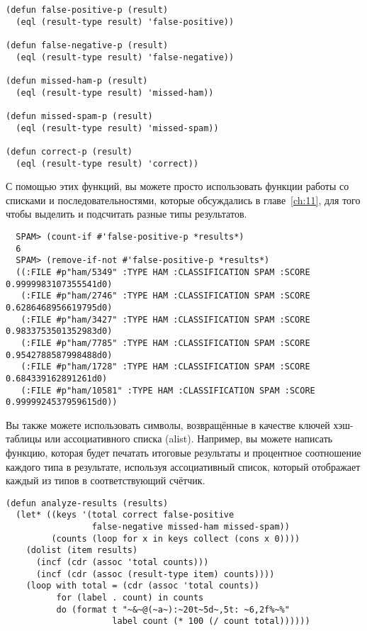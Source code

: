 \begin{lstlisting}
(defun false-positive-p (result)
  (eql (result-type result) 'false-positive))

(defun false-negative-p (result)
  (eql (result-type result) 'false-negative))

(defun missed-ham-p (result)
  (eql (result-type result) 'missed-ham))

(defun missed-spam-p (result)
  (eql (result-type result) 'missed-spam))

(defun correct-p (result)
  (eql (result-type result) 'correct))
\end{lstlisting}

С помощью этих функций, вы можете просто использовать функции работы со списками и
последовательностями, которые обсуждались в главе~\ref{ch:11}, для того чтобы выделить и
подсчитать разные типы результатов.

\begin{verbatim}
  SPAM> (count-if #'false-positive-p *results*)
  6
  SPAM> (remove-if-not #'false-positive-p *results*)
  ((:FILE #p"ham/5349" :TYPE HAM :CLASSIFICATION SPAM :SCORE 0.9999983107355541d0)
   (:FILE #p"ham/2746" :TYPE HAM :CLASSIFICATION SPAM :SCORE 0.6286468956619795d0)
   (:FILE #p"ham/3427" :TYPE HAM :CLASSIFICATION SPAM :SCORE 0.9833753501352983d0)
   (:FILE #p"ham/7785" :TYPE HAM :CLASSIFICATION SPAM :SCORE 0.9542788587998488d0)
   (:FILE #p"ham/1728" :TYPE HAM :CLASSIFICATION SPAM :SCORE 0.684339162891261d0)
   (:FILE #p"ham/10581" :TYPE HAM :CLASSIFICATION SPAM :SCORE 0.9999924537959615d0))
\end{verbatim}

Вы также можете использовать символы, возвращённые  в качестве ключей
хэш-таблицы или ассоциативного списка (alist).  Например, вы можете написать функцию,
которая будет печатать итоговые результаты и процентное соотношение каждого типа в
результате, используя ассоциативный список, который отображает каждый из типов в
соответствующий счётчик.

\begin{lstlisting}
(defun analyze-results (results)
  (let* ((keys '(total correct false-positive 
                 false-negative missed-ham missed-spam))
         (counts (loop for x in keys collect (cons x 0))))
    (dolist (item results)
      (incf (cdr (assoc 'total counts)))
      (incf (cdr (assoc (result-type item) counts))))
    (loop with total = (cdr (assoc 'total counts))
          for (label . count) in counts
          do (format t "~&~@(~a~):~20t~5d~,5t: ~6,2f%~%"
                     label count (* 100 (/ count total))))))
\end{lstlisting}

